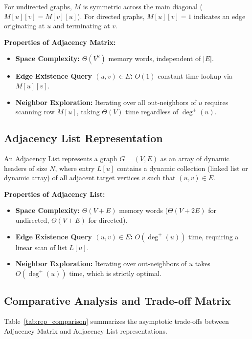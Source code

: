 \documentclass[10pt,journal,compsoc,onecolumn]{IEEEtran}
\begin{document}
For undirected graphs, $M$ is symmetric across the main diagonal ($M[u][v] = M[v][u]$). For directed graphs, $M[u][v] = 1$ indicates an edge originating at $u$ and terminating at $v$.

\textbf{Properties of Adjacency Matrix:}
\begin{itemize}
    \item \textbf{Space Complexity:} $\Theta(V^2)$ memory words, independent of $|E|$.
    \item \textbf{Edge Existence Query $(u, v) \in E$:} $O(1)$ constant time lookup via $M[u][v]$.
    \item \textbf{Neighbor Exploration:} Iterating over all out-neighbors of $u$ requires scanning row $M[u]$, taking $\Theta(V)$ time regardless of $\deg^+(u)$.
\end{itemize}

\subsection{Adjacency List Representation}

An Adjacency List represents a graph $G = (V, E)$ as an array of dynamic headers of size $N$, where entry $L[u]$ contains a dynamic collection (linked list or dynamic array) of all adjacent target vertices $v$ such that $(u, v) \in E$.

\textbf{Properties of Adjacency List:}
\begin{itemize}
    \item \textbf{Space Complexity:} $\Theta(V + E)$ memory words ($\Theta(V + 2E)$ for undirected, $\Theta(V + E)$ for directed).
    \item \textbf{Edge Existence Query $(u, v) \in E$:} $O(\deg^+(u))$ time, requiring a linear scan of list $L[u]$.
    \item \textbf{Neighbor Exploration:} Iterating over out-neighbors of $u$ takes $O(\deg^+(u))$ time, which is strictly optimal.
\end{itemize}

\subsection{Comparative Analysis and Trade-off Matrix}

Table~\ref{tab:rep_comparison} summarizes the asymptotic trade-offs between Adjacency Matrix and Adjacency List representations.
\end{document}
